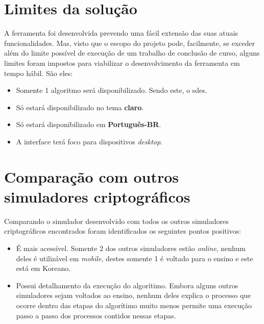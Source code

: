 \section{Limites da solução}
A ferramenta foi desenvolvida prevendo uma fácil extensão das suas atuais funcionalidades. Mas, visto que o escopo do projeto pode, facilmente, se exceder além do limite possível de execução de um trabalho de conclusão de curso, alguns limites foram impostos para viabilizar o desenvolvimento da ferramenta em tempo hábil. São eles:
\begin{itemize}
    \item Somente 1 algoritmo será disponibilizado. Sendo este, o \acrfull{sdes}.
    \item Só estará disponibilizado no tema \textbf{claro}.
    \item Só estará disponibilizado em \textbf{Português-BR}.
    \item A interface terá foco para dispositivos \textit{desktop}.
\end{itemize}

\section{Comparação com outros simuladores criptográficos}
Comparando o simulador desenvolvido com todos os outros simuladores criptográficos encontrados foram identificados os seguintes pontos positivos:

\begin{itemize}
    \item É mais acessível. Somente 2 dos outros simuladores estão \textit{online}, nenhum deles é utilizável em \textit{mobile}, destes somente 1 é voltado para o ensino e este está em Koreano. 
    \item Possui detalhamento da execução do algorítimo. Embora alguns outros simuladores sejam voltados ao ensino, nenhum deles explica o processo que ocorre dentro das etapas do algorítimo muito menos permite uma execução passo a passo dos processos contidos nessas etapas.
\end{itemize}

